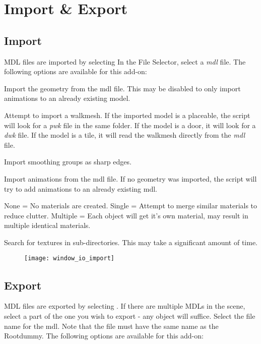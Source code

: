 \chapter{Import \& Export}

\section{Import}
MDL files are imported by selecting  In the File Selector, 
select a \textit{mdl} file. The following options are available for this add-on: 

\begin{description}[leftmargin=13em,style=nextline]
    \item[Import Geometry] Import the geometry from the mdl file. This may be disabled to only import animations to an already existing model.
    \item[Import Walkmesh] Attempt to import a walkmesh. If the imported model is a placeable, the script will look for a {\textit{pwk}} file in the same folder. If the model is a door, it will look for a {\textit{dwk}} file. If the model is a tile, it will read the walkmesh directly from the \textit{mdl} file.
    \item[Import Smooth Groups] Import smoothing groups as sharp edges.
    \item[Import Animations] Import animations from the mdl file. If no geometry was imported, the script will try to add animations to an already existing mdl.
    \item[Materials] None = No materials are created. Single = Attempt to merge similar materials to reduce clutter. Multiple = Each object will get it's own material, may result in multiple identical materials.
    \item[Image Search] Search for textures in sub-directories. This may take a significant amount of time.
\end{description}

\begin{figure}[hb]
    \centering
    \texttt{[image: window\_io\_import]}
\end{figure}

\section{Export}
MDL files are exported by selecting . If there are multiple MDLs in the scene,
select a part of the one you wish to export - any object will suffice. Select the file name for the mdl. Note that the 
file must have the same name as the Rootdummy. The following options are available for this add-on: 


